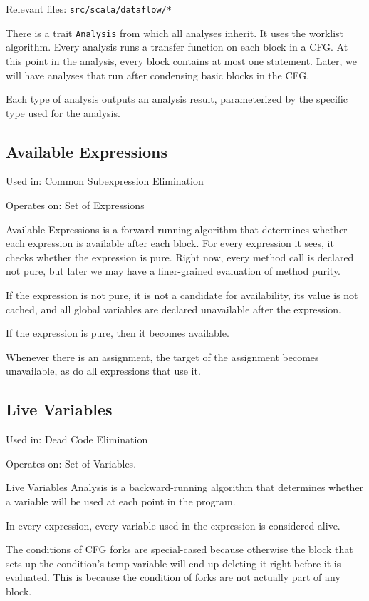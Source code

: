 \documentclass[11pt]{article}
\begin{document}
  Relevant files: \texttt{src/scala/dataflow/*}
  
  There is a trait \texttt{Analysis} from which all analyses inherit. It uses the worklist algorithm.
  Every analysis runs a transfer function on each block in a CFG. At this point in the analysis,
  every block contains at most one statement. Later, we will have analyses that run after condensing
  basic blocks in the CFG.

  Each type of analysis outputs an analysis result, parameterized by the specific type used for the analysis.

\subsection{Available Expressions}
\label{sec-2.1}

  Used in: Common Subexpression Elimination

  Operates on: Set of Expressions

  Available Expressions is a forward-running algorithm that determines whether each expression is available
  after each block. For every expression it sees, it checks whether the expression is pure. Right now, 
  every method call is declared not pure, but later we may have a finer-grained evaluation of method purity.

  If the expression is not pure, it is not a candidate for availability, its value is not cached, and all
  global variables are declared unavailable after the expression.

  If the expression is pure, then it becomes available.

  Whenever there is an assignment, the target of the assignment becomes unavailable, as do all expressions
  that use it.

\subsection{Live Variables}
\label{sec-2.2}

  Used in: Dead Code Elimination

  Operates on: Set of Variables.

  Live Variables Analysis is a backward-running algorithm that determines whether a variable will be used
  at each point in the program. 

  In every expression, every variable used in the expression is considered alive.

  The conditions of CFG forks are special-cased because otherwise the block that sets up the condition's
  temp variable will end up deleting it right before it is evaluated. This is because the condition of forks
  are not actually part of any block.
\end{document}
